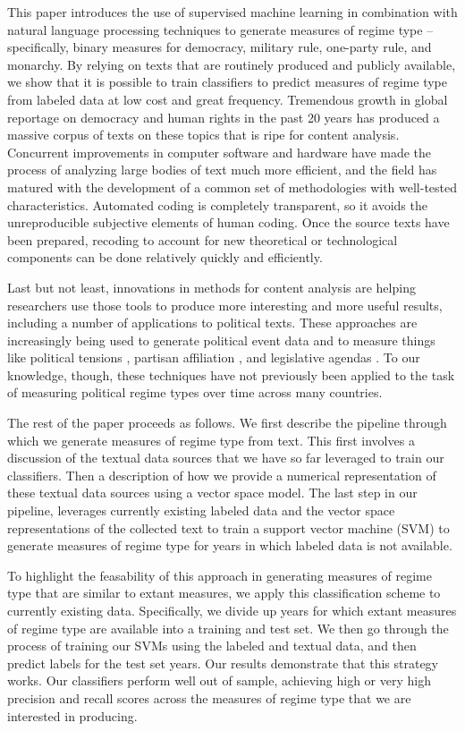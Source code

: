 \documentclass[pdftex,12pt,fullpage,oneside]{amsart}
\begin{document}
This paper introduces the use of supervised machine learning in combination with natural language processing techniques to generate measures of regime type -- specifically, binary measures for democracy, military rule, one-party rule, and monarchy. By relying on texts that are routinely produced and publicly available, we show that it is possible to train classifiers to predict measures of regime type from labeled data at low cost and great frequency. Tremendous growth in global reportage on democracy and human rights in the past 20 years has produced a massive corpus of texts on these topics that is ripe for content analysis. Concurrent improvements in computer software and hardware have made the process of analyzing large bodies of text much more efficient, and the field has matured with the development of a common set of methodologies with well-tested characteristics. Automated coding is completely transparent, so it avoids the unreproducible subjective elements of human coding. Once the source texts have been prepared, recoding to account for new theoretical or technological components can be done relatively quickly and efficiently. 

Last but not least, innovations in methods for content analysis are helping researchers use those tools to produce more interesting and more useful results, including a number of applications to political texts. These approaches are increasingly being used to generate political event data \cite{dorazio:etal:2014,king:lowe:2003,oconnor:etal:2013} and to measure things like political tensions \cite{chadefaux:2014}, partisan affiliation \citep{slapin:proksch:2010,yu:etal:2008}, and legislative agendas \citep{grimmer:2010}. To our knowledge, though, these techniques have not previously been applied to the task of measuring political regime types over time across many countries. 

The rest of the paper proceeds as follows. We first describe the pipeline through which we generate measures of regime type from text. This first involves a discussion of the textual data sources that we have so far leveraged to train our classifiers. Then a description of how we provide a numerical representation of these textual data sources using a vector space model. The last step in our pipeline, leverages currently existing labeled data and the vector space representations of the collected text to train a support vector machine (SVM) to generate measures of regime type for years in which labeled data is not available. 

To highlight the feasability of this approach in generating measures of regime type that are similar to extant measures, we apply this classification scheme to currently existing data. Specifically, we divide up years for which extant measures of regime type are available into a training and test set. We then go through the process of training our SVMs using the labeled and textual data, and then predict labels for the test set years. Our results demonstrate that this strategy works. Our classifiers perform well out of sample, achieving high or very high precision and recall scores across the measures of regime type that we are interested in producing. 
\end{document}

